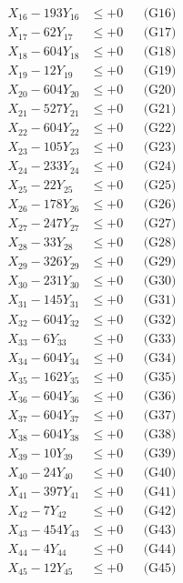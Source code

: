 \documentclass[a4paper,10pt]{article}
\begin{document}
{\begin{align}
X_{16} - 193Y_{16} &\leq +0 && \text{(G16)} \\
X_{17} - 62Y_{17} &\leq +0 && \text{(G17)} \\
X_{18} - 604Y_{18} &\leq +0 && \text{(G18)} \\
X_{19} - 12Y_{19} &\leq +0 && \text{(G19)} \\
X_{20} - 604Y_{20} &\leq +0 && \text{(G20)} \\
\allowbreak
X_{21} - 527Y_{21} &\leq +0 && \text{(G21)} \\
X_{22} - 604Y_{22} &\leq +0 && \text{(G22)} \\
X_{23} - 105Y_{23} &\leq +0 && \text{(G23)} \\
X_{24} - 233Y_{24} &\leq +0 && \text{(G24)} \\
X_{25} - 22Y_{25} &\leq +0 && \text{(G25)} \\
X_{26} - 178Y_{26} &\leq +0 && \text{(G26)} \\
X_{27} - 247Y_{27} &\leq +0 && \text{(G27)} \\
X_{28} - 33Y_{28} &\leq +0 && \text{(G28)} \\
X_{29} - 326Y_{29} &\leq +0 && \text{(G29)} \\
X_{30} - 231Y_{30} &\leq +0 && \text{(G30)} \\
\allowbreak
X_{31} - 145Y_{31} &\leq +0 && \text{(G31)} \\
X_{32} - 604Y_{32} &\leq +0 && \text{(G32)} \\
X_{33} - 6Y_{33} &\leq +0 && \text{(G33)} \\
X_{34} - 604Y_{34} &\leq +0 && \text{(G34)} \\
X_{35} - 162Y_{35} &\leq +0 && \text{(G35)} \\
X_{36} - 604Y_{36} &\leq +0 && \text{(G36)} \\
X_{37} - 604Y_{37} &\leq +0 && \text{(G37)} \\
X_{38} - 604Y_{38} &\leq +0 && \text{(G38)} \\
X_{39} - 10Y_{39} &\leq +0 && \text{(G39)} \\
X_{40} - 24Y_{40} &\leq +0 && \text{(G40)} \\
\allowbreak
X_{41} - 397Y_{41} &\leq +0 && \text{(G41)} \\
X_{42} - 7Y_{42} &\leq +0 && \text{(G42)} \\
X_{43} - 454Y_{43} &\leq +0 && \text{(G43)} \\
X_{44} - 4Y_{44} &\leq +0 && \text{(G44)} \\
X_{45} - 12Y_{45} &\leq +0 && \text{(G45)} \\

\end{align}}
\end{document}
